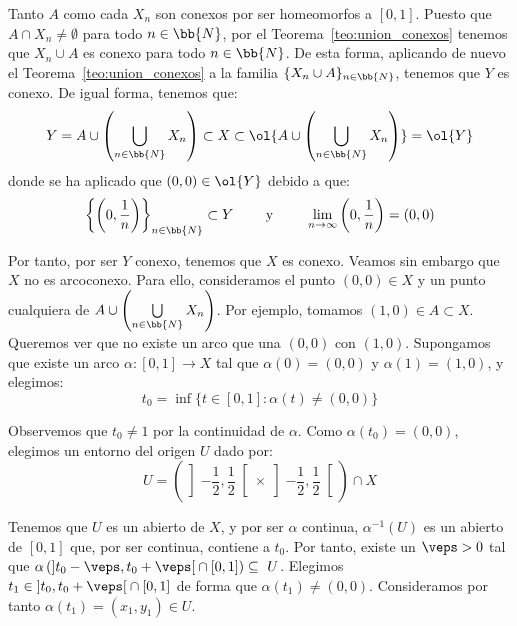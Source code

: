 \begin{ejemplo}
    Tanto $A$ como cada $X_n$ son conexos por ser homeomorfos a $[0,1]$. Puesto que $A\cap X_n \neq \emptyset$ para todo $n\in \bb{N}$, por el Teorema~\ref{teo:union_conexos} tenemos que $X_n\cup A$ es conexo para todo $n\in \bb{N}$. De esta forma, aplicando de nuevo el Teorema~\ref{teo:union_conexos} a la familia $\{X_n\cup A\}_{n\in \bb{N}}$, tenemos que $Y$ es conexo. De igual forma, tenemos que:
    \begin{equation*}
        Y = A\cup \left(\bigcup\limits_{n\in \bb{N}}X_n\right) \subset X \subset \ol{A\cup \left(\bigcup\limits_{n\in \bb{N}}X_n\right)} = \ol{Y}
    \end{equation*}
    donde se ha aplicado que $(0,0)\in \ol{Y}$ debido a que:
    \begin{equation*}
        \left\{\left(0,\frac{1}{n}\right)\right\}_{n\in \bb{N}}\subset Y \qquad \text{ y } \qquad \lim_{n\to \infty}\left(0,\frac{1}{n}\right) = (0,0)
    \end{equation*}

    Por tanto, por ser $Y$ conexo, tenemos que $X$ es conexo. Veamos sin embargo que $X$ no es arcoconexo. Para ello, consideramos el punto $(0,0)\in X$ y un punto cualquiera de $A\cup \left(\bigcup\limits_{n\in \bb{N}}X_n\right)$. Por ejemplo, tomamos $(1,0)\in A\subset X$. Queremos ver que no existe un arco que una $(0,0)$ con $(1,0)$. Supongamos que existe un arco $\alpha:[0,1]\to X$ tal que $\alpha(0)=(0,0)$ y $\alpha(1)=(1,0)$, y elegimos:
    \begin{equation*}
        t_0 = \inf\{t\in [0,1] : \alpha(t)\neq (0,0)\}
    \end{equation*}

    Observemos que $t_0\neq 1$ por la continuidad de $\alpha$. Como $\alpha(t_0)=(0,0)$, elegimos un entorno del origen $U$ dado por:
    \begin{equation*}
        U=\left(\left]-\frac{1}{2}, \frac{1}{2}\right[\times \left]-\frac{1}{2}, \frac{1}{2}\right[\right)\cap X
    \end{equation*}

    Tenemos que $U$ es un abierto de $X$, y por ser $\alpha$ continua, $\alpha^{-1}(U)$ es un abierto de $[0,1]$ que, por ser continua, contiene a $t_0$. Por tanto, existe un $\veps>0$ tal que $\alpha\left(\left]t_0-\veps, t_0+\veps\right[\cap [0,1]\right)\subseteq~U$. Elegimos $t_1\in \left]t_0, t_0+\veps\right[\cap [0,1]$ de forma que $\alpha(t_1)\neq (0,0)$. Consideramos por tanto $\alpha(t_1) = (x_1, y_1)\in U$.\\


\end{ejemplo}
